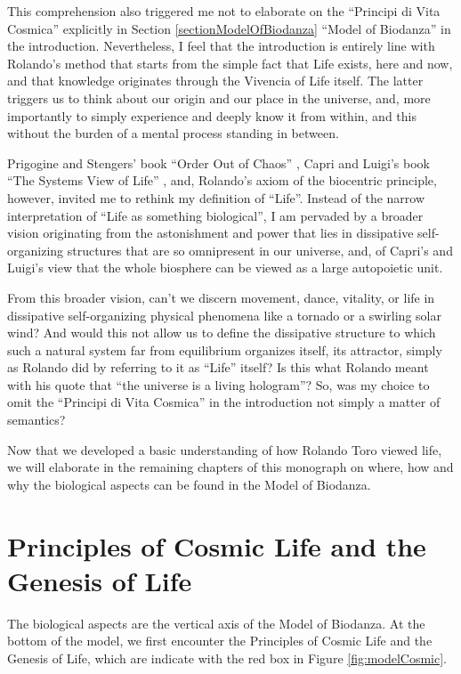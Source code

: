 \documentclass[
  11pt,
]{book}
\begin{document}
This comprehension also triggered me not to elaborate on the ``Principi di Vita Cosmica'' explicitly in Section \ref{sectionModelOfBiodanza} ``Model of Biodanza'' in the introduction. Nevertheless, I feel that the introduction is entirely line with Rolando's method that starts from the simple fact that Life exists, here and now, and that knowledge originates through the Vivencia of Life itself. The latter triggers us to think about our origin and our place in the universe, and, more importantly to simply experience and deeply know it from within, and this without the burden of a mental process standing in between.

Prigogine and Stengers' book ``Order Out of Chaos'' \citep{prigogineStengers1984}, Capri and Luigi's book ``The Systems View of Life'' \citep{capraLuisi2014}, and, Rolando's axiom of the biocentric principle, however, invited me to rethink my definition of ``Life''. Instead of the narrow interpretation of ``Life as something biological'', I am pervaded by a broader vision originating from the astonishment and power that lies in dissipative self-organizing structures that are so omnipresent in our universe, and, of Capri's and Luigi's view that the whole biosphere can be viewed as a large autopoietic unit.

From this broader vision, can't we discern movement, dance, vitality, or life in dissipative self-organizing physical phenomena like a tornado or a swirling solar wind? And would this not allow us to define the dissipative structure to which such a natural system far from equilibrium organizes itself, its attractor, simply as Rolando did by referring to it as ``Life'' itself? Is this what Rolando meant with his quote that ``the universe is a living hologram''? So, was my choice to omit the ``Principi di Vita Cosmica'' in the introduction not simply a matter of semantics?

Now that we developed a basic understanding of how Rolando Toro viewed life, we will elaborate in the remaining chapters of this monograph on where, how and why the biological aspects can be found in the Model of Biodanza.

\hypertarget{principles-of-cosmic-life-and-the-genesis-of-life}{%
\chapter{Principles of Cosmic Life and the Genesis of Life}\label{principles-of-cosmic-life-and-the-genesis-of-life}}

The biological aspects are the vertical axis of the Model of Biodanza.
At the bottom of the model, we first encounter the Principles of Cosmic Life and the Genesis of Life, which are indicate with the red box in Figure \ref{fig:modelCosmic}.
\end{document}
